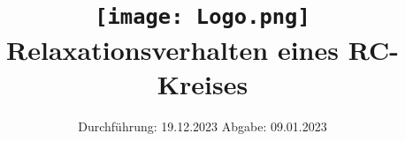 

\subject{V353}
\title{\texttt{[image: Logo.png]}
Relaxationsverhalten eines RC-Kreises}
\date{%
  Durchführung: 19.12.2023
  \hspace{3em}
  Abgabe: 09.01.2023
}





\maketitle
\thispagestyle{empty}
\tableofcontents
\newpage






\printbibliography{}



